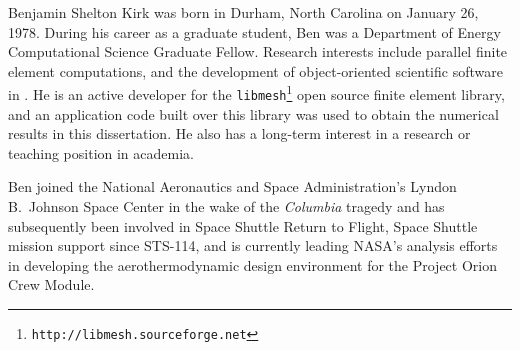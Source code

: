 
Benjamin Shelton Kirk was born in Durham, North Carolina on January 26, 1978.  During his career as a graduate student, Ben was a Department of Energy Computational Science Graduate Fellow. Research interests include parallel finite element computations, and the development of object-oriented scientific software in \cpp. He is an active developer for the \texttt{libmesh}\footnote{\texttt{http://libmesh.sourceforge.net}} open source finite element library, and an application code built over this library was used to obtain the numerical results in this dissertation. He also has a long-term interest in a research or teaching position in academia.

Ben joined the National Aeronautics and Space Administration's Lyndon B.\ Johnson Space Center in the wake of the \emph{Columbia} tragedy and has subsequently been involved in Space Shuttle Return to Flight, Space Shuttle mission support since STS-114, and is currently leading NASA's analysis efforts in developing the aerothermodynamic design environment for the Project Orion Crew Module.

